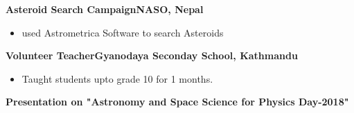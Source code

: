 \textbf{Asteroid Search Campaign\hfill NASO, Nepal}\par

\begin{itemize}
	\item used Astrometrica Software to search Asteroids

\end{itemize}\par


\textbf{Volunteer Teacher\hfill Gyanodaya Seconday School, Kathmandu}\par

\begin{itemize}
	\item Taught students upto grade 10 for 1 months.

\end{itemize}\par

\textbf{Presentation on "Astronomy and Space Science for Physics Day-2018"}\par